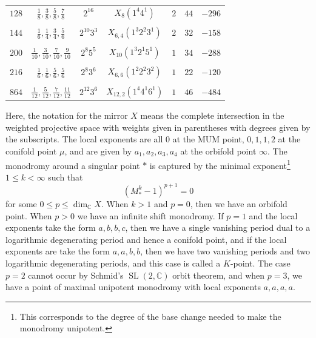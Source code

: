 \documentclass[10pt]{amsart}
\theoremstyle{definition}
\theoremstyle{remark}
\theoremstyle{plain}
\theoremstyle{definition}
\theoremstyle{remark}
\newcommand{\C}{\mathbb{C}}
\newcommand{\on}[1]{\operatorname{#1}}
\newcommand{\1}{\mathbf{1}}
\newcommand{\2}{\mathbf{2}}
\newcommand{\3}{\mathbf{3}}
\begin{document}
\begin{table}[htpb]
\begin{tabular}{ccccccc}
        $128$ & $\frac{1}{8},\frac{3}{8},\frac{5}{8},\frac{7}{8}$ & $2^{16}$ & $X_{8}(1^4 4^1)$ & $2$ & $44$ & $-296$ \\
        \\[-0.8em]
        $144$ & $\frac{1}{6},\frac{1}{4},\frac{3}{4},\frac{5}{6}$ & $2^{10}3^3$ & $X_{6,4}(1^3 2^2 3^1)$ & $2$ & $32$ & $-158$ \\
        \\[-0.8em]
        $200$ & $\frac{1}{10},\frac{3}{10},\frac{7}{10},\frac{9}{10}$ & $2^{8}5^5$ & $X_{10}(1^3 2^1 5^1)$ & $1$ & $34$ & $-288$ \\
        \\[-0.8em]
        $216$ & $\frac{1}{6},\frac{1}{6},\frac{5}{6},\frac{5}{6}$ & $2^{8}3^6$ & $X_{6,6}(1^2 2^2 3^2)$ & $1$ & $22$ & $-120$ \\
        \\[-0.8em]
        $864$ & $\frac{1}{12},\frac{5}{12},\frac{7}{12},\frac{11}{12}$ & $2^{12}3^6$ & $X_{12,2}(1^4 4^1 6^1)$ & $1$ & $46$ & $-484$ \\
        \bottomrule
    \end{tabular}
\end{table}
Here, the notation for the mirror $X$ means the complete intersection in the weighted projective space with weights given in parentheses with degrees given by the subscripts. The local exponents are all $0$ at the MUM point, $0,1,1,2$ at the conifold point $\mu$, and are given by $a_1, a_2, a_3, a_4$ at the orbifold point $\infty$. The monodromy around a singular point $*$ is captured by the minimal exponent\footnote{This corresponds to the degree of the base change needed to make the monodromy unipotent.} $1 \leq k < \infty$ such that
\[ (M_*^k-1)^{p+1} = 0 \]
for some $0 \leq p \leq \dim_{\C} X$. When $k > 1$ and $p=0$, then we have an orbifold point. When $p > 0$ we have an infinite shift monodromy. If $p=1$ and the local exponents take the form $a,b,b,c$, then we have a single vanishing period dual to a logarithmic degenerating period and hence a conifold point, and if the local exponents are take the form $a,a,b,b$, then we have two vanishing periods and two logarithmic degenerating periods, and this case is called a $K$-point. The case $p=2$ cannot occur by Schmid's $\on{SL}(2,\C)$ orbit theorem, and when $p=3$, we have a point of maximal unipotent monodromy with local exponents $a,a,a,a$.
\end{document}
